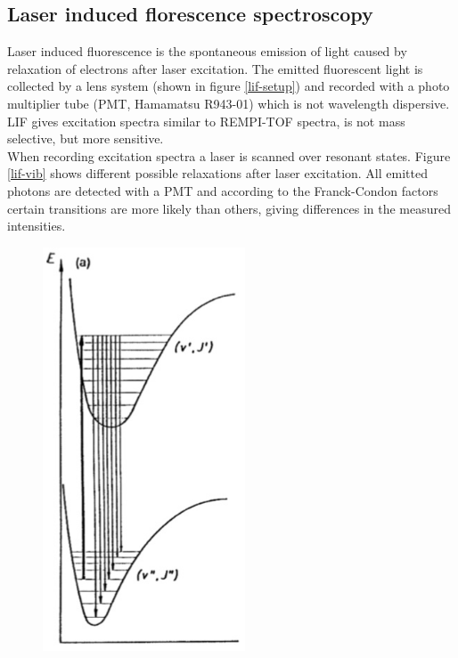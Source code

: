 \documentclass[parskip,12pt,headsepline,a4paper] {scrbook}
\begin{document}
\subsection{Laser induced florescence spectroscopy}
\vspace{-1\baselineskip}
Laser induced fluorescence is the spontaneous emission of light caused by relaxation of electrons after laser excitation. The emitted fluorescent light is collected by a lens system (shown in figure \ref{lif-setup}) and recorded with a photo multiplier tube (PMT, Hamamatsu R943-01) which is not wavelength dispersive. LIF gives excitation spectra similar to REMPI-TOF spectra, is not mass selective, but more sensitive. \\
When recording excitation spectra a laser is scanned over resonant states. Figure \ref{lif-vib} shows different possible relaxations after laser excitation. All emitted photons are detected with a PMT and according to the Franck-Condon factors certain transitions are more likely than others, giving differences in the measured intensities.

\begin{figure}[ht]
\centerline{
\includegraphics[width=6cm]{./measuring_methods/lif-vib.jpg}}
\end{figure}
\end{document}
